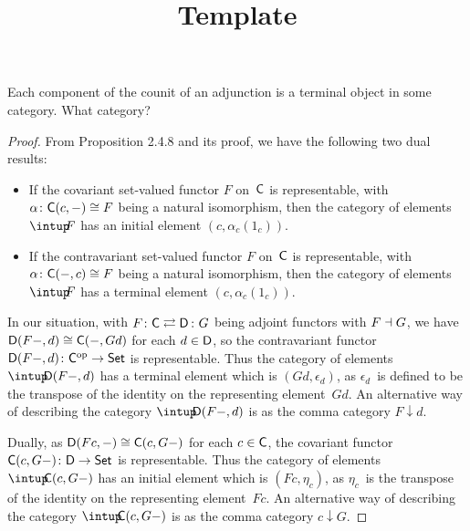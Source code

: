 \documentclass[../../solutions]{subfiles}
\title{Template}
\author{}
\begin{document}
\maketitle

%   

\begin{exercise}
  Each component of the counit of an adjunction is a terminal object
  in some category.  What category?
\end{exercise}

\begin{proof}
  From Proposition 2.4.8 and its proof, we have the following two dual
  results:
  \begin{itemize}
  \item If the covariant set-valued functor $F$ on~${\mathsf{C}}$ is
    representable, with ${\alpha}\colon{{\mathsf{C}}(c,-)}\cong{F}$ being a natural
    isomorphism, then the category of elements $\el F$ has an initial
    element $(c,\alpha_c(1_c))$.
  \item If the contravariant set-valued functor $F$ on~${\mathsf{C}}$ is
    representable, with ${\alpha}\colon{{\mathsf{C}}(-,c)}\cong{F}$ being a natural
    isomorphism, then the category of elements $\el F$ has a terminal
    element $(c,\alpha_c(1_c))$.
  \end{itemize}

  In our situation, with $\afunc{F}{G}{\sC}{\sD}$ being adjoint
  functors with $F\dashv G$, we have ${\mathsf{D}}(F-,d)\cong {\mathsf{C}}(-,Gd)$ for
  each $d\in{\mathsf{D}}$, so the contravariant functor
  ${{\mathsf{D}}(F-,d)}\colon{{\mathsf{C}}^{\mathrm{op}}}\to{\ensuremath{\mathsf{Set}}}$ is representable.  Thus the
  category of elements $\el \sD(F-,d)$ has a terminal element which is
  $(Gd,\epsilon_d)$, as $\epsilon_d$~is defined to be the transpose of
  the identity on the representing element~$Gd$.  An alternative way
  of describing the category $\el \sD(F-,d)$ is as the comma category
  $F\downarrow d$.

  Dually, as ${\mathsf{D}}(Fc,-)\cong {\mathsf{C}}(c,G-)$ for each $c\in{\mathsf{C}}$, the
  covariant functor ${{\mathsf{C}}(c,G-)}\colon{{\mathsf{D}}}\to{\ensuremath{\mathsf{Set}}}$ is representable.
  Thus the category of elements $\el \sC(c,G-)$ has an initial element
  which is $(Fc,\eta_c)$, as $\eta_c$~is the transpose of the identity
  on the representing element~$Fc$.  An alternative way of describing
  the category $\el \sC(c,G-)$ is as the comma category
  $c\downarrow G$.
\end{proof}
\end{document}
